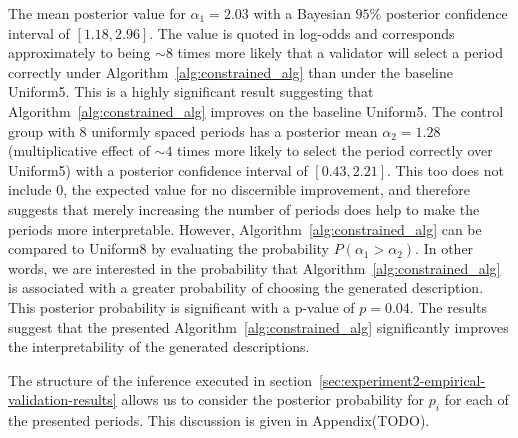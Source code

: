 The mean posterior value for $\alpha_1 = 2.03$ with a Bayesian $95\%$ posterior confidence interval of $[1.18, 2.96]$. The value is quoted in log-odds and corresponds approximately to being $\sim 8$ times more likely that a validator will select a period correctly under Algorithm~\ref{alg:constrained_alg} than under the baseline Uniform5. This is a highly significant result suggesting that Algorithm~\ref{alg:constrained_alg} improves on the baseline Uniform5. The control group with 8 uniformly spaced periods has a posterior mean $\alpha_2 = 1.28$ (multiplicative effect of $\sim 4$ times more likely to select the period correctly over Uniform5) with a posterior confidence interval of $[0.43, 2.21]$. This too does not include $0$, the expected value for no discernible improvement, and therefore suggests that merely increasing the number of periods does help to make the periods more interpretable. However, Algorithm~\ref{alg:constrained_alg} can be compared to Uniform8 by evaluating the probability $P(\alpha_1 > \alpha_2)$. In other words, we are interested in the probability that Algorithm~\ref{alg:constrained_alg} is associated with a greater probability of choosing the generated description. This posterior probability is significant with a p-value of $p = 0.04$. The results suggest that the presented Algorithm~\ref{alg:constrained_alg} significantly improves the interpretability of the generated descriptions.

The structure of the inference executed in section~\ref{sec:experiment2-empirical-validation-results} allows us to consider the posterior probability for $p_i$ for each of the presented periods. This discussion is given in Appendix(TODO).%
